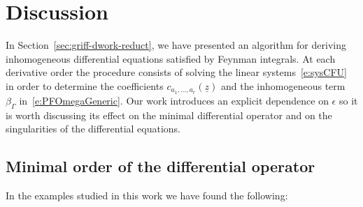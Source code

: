 \documentclass[a4paper,12pt]{article}
\numberwithin{equation}{section}
\numberwithin{figure}{section}
\begin{document}
\section{Discussion}
%
In Section~\ref{sec:griff-dwork-reduct}, we have presented an
algorithm for deriving inhomogeneous differential equations satisfied by Feynman
integrals. At each derivative order the
 procedure consists of solving the linear systems~\eqref{e:sysCFU} in order to
determine the coefficients $c_{a_1,\dots,a_r}(\underline z)$ and the 
inhomogeneous term $\beta_\Gamma$ in~\eqref{e:PFOmegaGeneric}. Our work introduces an explicit dependence on $\epsilon$ so it is worth discussing  its effect on the minimal differential
operator and on the singularities of the differential equations.
%

\subsection{Minimal order of the differential operator}
\label{sec:minim-order-diff}

In the examples studied in this work we have found the following:
\end{document}
